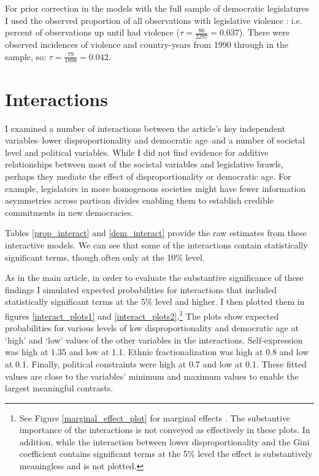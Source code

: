 \documentclass[a4paper]{article}\usepackage[]{graphicx}\usepackage[]{color}
\begin{document}
For prior correction \citep[see][]{KingRareEventsPA2001} in the models with the full sample of democratic legislatures I used the observed proportion of all observations with legislative violence : i.e.  percent of observations up until  had violence ($\tau = \frac{86}{2297} = 0.037$). There were  observed incidences of violence and  country-years from 1990 through  in the sample, so: $\tau = \frac{79}{1898} = 0.042$.

\section*{Interactions}


I examined a number of interactions between the article's key independent variables--lower disproportionality and democratic age--and a number of societal level and political variables. While I did not find evidence for additive relationships between most of the societal variables and legislative brawls, perhaps they mediate the effect of disproportionality or democratic age. For example, legislators in more homogenous societies might have fewer information asymmetries across partisan divides enabling them to establish credible commitments in new democracies.

Tables \ref{prop_interact} and \ref{dem_interact} provide the raw estimates from these interactive models. We can see that some of the interactions contain statistically significant terms, though often only at the 10\% level.

As in the main article, in order to evaluate the substantive significance of these findings I simulated expected probabilities for interactions that included statistically significant terms at the 5\% level and higher. I then plotted them in figures \ref{interact_plots1} and \ref{interact_plots2}.\footnote{See Figure \ref{marginal_effect_plot} for marginal effects \citep{Brambor2006}. The substantive importance of the interactions is not conveyed as effectively in these plots. In addition, while the interaction between lower disproportionality and the Gini coefficient contains significant terms at the 5\% level the effect is substantively meaningless and is not plotted.} The plots show expected probabilities for various levels of low disproportionality and democratic age at `high' and `low' values of the other variables in the interactions. Self-expression was high at 1.35 and low at 1.1. Ethnic fractionalization was high at 0.8 and low at 0.1. Finally, political constraints were high at 0.7 and low at 0.1. These fitted values are close to the variables' minimum and maximum values to enable the largest meaningful contrasts.
\end{document}
